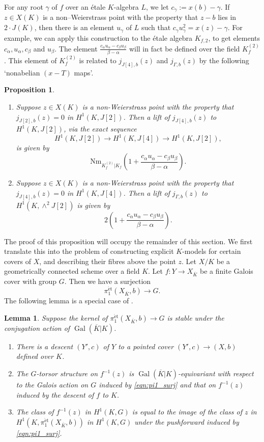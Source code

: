 \documentclass[11pt]{amsart}
\theoremstyle{plain}
\newtheorem{lemma}{Lemma}
\newtheorem{proposition}{Proposition}
\theoremstyle{definition}
\DeclareMathOperator{\Gal}{Gal}
\newcommand{\Nm}{\mathrm{Nm}}
\newcommand{\et}{\mathrm{\acute{e}t}}
\begin{document}
For any root $\gamma $ of $f$ over an \'etale $K$-algebra $L$, we let $c_{\gamma }:=x(b)-\gamma $. If $z\in X(K)$ is a non--Weierstrass point with the property that $z-b$ lies in $2\cdot J(K)$, then there is an element $u_{\gamma }$ of $L$ such that $c_{\gamma }u_{\gamma }^2 =x(z)-\gamma $. For example, we can apply this construction to the \'etale algebra $K_{f,2}$, to get elements $c_{\alpha },u_{\alpha },c_{\beta }$ and $u_{\beta }$. The element $\frac{c_{\alpha }u_{\alpha }-c_{\beta }u_{\beta }}{\beta -\alpha }$ will in fact be defined over the field $K_f ^{(2)}$. This element of $K_f ^{(2)}$ is related to $j_{J[4],b}(z)$ and $j_{\Gamma ,b}(z)$ by the following `nonabelian $(x-T)$ maps'.
\begin{proposition}\label{prop:main2}
\begin{enumerate}
\item Suppose $z\in X(K)$ is a non-Weierstrass point with the property that $j_{J[2],b}(z)=0$ in $H^1 (K,J[2])$. Then a lift of $j_{J[4] ,b}(z)$ to $H^1 (K,J[2])$, via the exact sequence
\[
H^1 (K,J[2])\to H^1 (K,J[4])\to H^1 (K,J[2]),
\] 
is given by 
\[
\Nm _{K_f ^{(2)}|K_f }\left(1+ \frac{c_{\alpha }u_{\alpha }-c_{\beta }u_{\beta }}{\beta -\alpha }\right) .
\]
\item Suppose $z\in X(K)$ is a non-Weierstrass point with the property that $j_{J[4],b}(z)=0$ in $H^1 (K,J[4])$. Then a lift of $j_{\Gamma  ,b}(z)$ to $H^1 (K,\wedge ^2 J[2])$ is given by 
\[
2\left(1+ \frac{c_{\alpha }u_{\alpha }-c_{\beta }u_{\beta }}{\beta -\alpha }\right) .
\]
\end{enumerate}
\end{proposition}
The proof of this proposition will occupy the remainder of this section. We first translate this into the problem of constructing explicit $K$-models for certain covers of $X$, and describing their fibres above the point $z$. Let $X/K$ be a geometrically connected scheme over a field $K$. Let $f:Y\to X_{\overline{K}}$ be a finite Galois cover with group $G$. Then we have a surjection
\begin{equation}\label{eqn:pi1_surj}
\pi _1 ^{\et }(X_{\overline{K}} ,b)\to G.
\end{equation}
The following lemma is a special case of \cite[Corollary 34]{stix:arithmetic}.
\begin{lemma}\label{lemma:descent}
Suppose the kernel of $\pi _1 ^{\et }(X_{\overline{K}},b)\to G$ is stable under the conjugation action of $\Gal (\overline{K}|K)$.
\begin{enumerate}
\item There is a descent $(Y',c)$ of $Y$ to a pointed cover $(Y',c)\to (X,b)$ defined over $K$. 
\item The $G$-torsor structure on $f^{-1}(z)$ is $\Gal (\overline{K}|K)$-equivariant with respect to the Galois action on $G$ induced by \eqref{eqn:pi1_surj} and that on $f^{-1}(z)$ induced by the descent of $f$ to $K$.
\item The class of $f^{-1}(z)$ in $H^1 (K,G)$ is equal to the image of the class of $z$ in $H^1 (K,\pi _1 ^{\et }(X_{\overline{K}},b))$ in $H^1 (K,G)$ under the pushforward induced by \eqref{eqn:pi1_surj}.
\end{enumerate}
\end{lemma}
\end{document}
